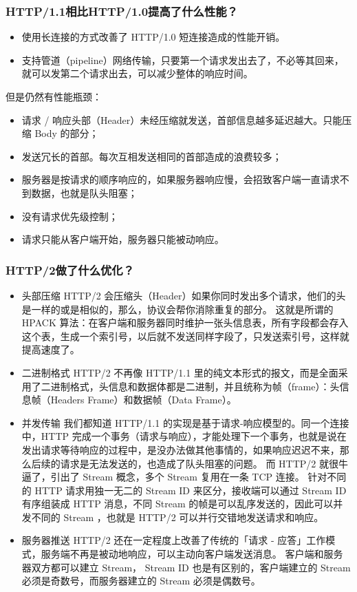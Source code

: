 \documentclass[11pt]{article}
\begin{document}
\subsubsection{HTTP/1.1相比HTTP/1.0提高了什么性能？}
\label{sec:orgd3694db}
\begin{itemize}
\item 使用长连接的方式改善了 HTTP/1.0 短连接造成的性能开销。
\item 支持管道（pipeline）网络传输，只要第一个请求发出去了，不必等其回来，就可以发第二个请求出去，可以减少整体的响应时间。
\end{itemize}
但是仍然有性能瓶颈：
\begin{itemize}
\item 请求 / 响应头部（Header）未经压缩就发送，首部信息越多延迟越大。只能压缩 Body 的部分；
\item 发送冗长的首部。每次互相发送相同的首部造成的浪费较多；
\item 服务器是按请求的顺序响应的，如果服务器响应慢，会招致客户端一直请求不到数据，也就是队头阻塞；
\item 没有请求优先级控制；
\item 请求只能从客户端开始，服务器只能被动响应。
\end{itemize}
\subsubsection{HTTP/2做了什么优化？}
\label{sec:org5eef23f}
\begin{itemize}
\item 头部压缩
HTTP/2 会压缩头（Header）如果你同时发出多个请求，他们的头是一样的或是相似的，那么，协议会帮你消除重复的部分。
这就是所谓的 HPACK 算法：在客户端和服务器同时维护一张头信息表，所有字段都会存入这个表，生成一个索引号，以后就不发送同样字段了，只发送索引号，这样就提高速度了。
\item 二进制格式
HTTP/2 不再像 HTTP/1.1 里的纯文本形式的报文，而是全面采用了二进制格式，头信息和数据体都是二进制，并且统称为帧（frame）：头信息帧（Headers Frame）和数据帧（Data Frame）。
\item 并发传输
我们都知道 HTTP/1.1 的实现是基于请求-响应模型的。同一个连接中，HTTP 完成一个事务（请求与响应），才能处理下一个事务，也就是说在发出请求等待响应的过程中，是没办法做其他事情的，如果响应迟迟不来，那么后续的请求是无法发送的，也造成了队头阻塞的问题。
而 HTTP/2 就很牛逼了，引出了 Stream 概念，多个 Stream 复用在一条 TCP 连接。
针对不同的 HTTP 请求用独一无二的 Stream ID 来区分，接收端可以通过 Stream ID 有序组装成 HTTP 消息，不同 Stream 的帧是可以乱序发送的，因此可以并发不同的 Stream ，也就是 HTTP/2 可以并行交错地发送请求和响应。
\item 服务器推送
HTTP/2 还在一定程度上改善了传统的「请求 - 应答」工作模式，服务端不再是被动地响应，可以主动向客户端发送消息。
客户端和服务器双方都可以建立 Stream， Stream ID 也是有区别的，客户端建立的 Stream 必须是奇数号，而服务器建立的 Stream 必须是偶数号。
\end{itemize}
\end{document}
